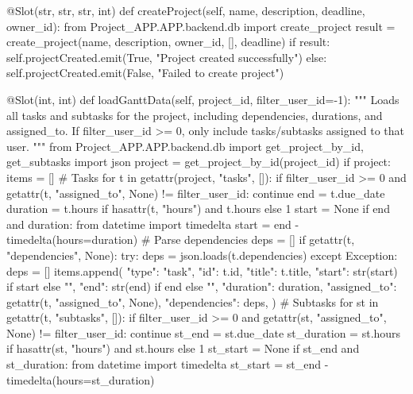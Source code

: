 \documentclass{report}
\begin{document}
\begin{python}
    @Slot(str, str, str, int)
    def createProject(self, name, description, deadline, owner_id):
        from Project_APP.APP.backend.db import create_project
        result = create_project(name, description, owner_id, [], deadline)
        if result:
            self.projectCreated.emit(True, "Project created successfully")
        else:
            self.projectCreated.emit(False, "Failed to create project")

    @Slot(int, int)
    def loadGanttData(self, project_id, filter_user_id=-1):
        """
        Loads all tasks and subtasks for the project, including dependencies, durations, and assigned_to.
        If filter_user_id >= 0, only include tasks/subtasks assigned to that user.
        """
        from Project_APP.APP.backend.db import get_project_by_id, get_subtasks
        import json
        project = get_project_by_id(project_id)
        if project:
            items = []
            # Tasks
            for t in getattr(project, "tasks", []):
                if filter_user_id >= 0 and getattr(t, "assigned_to", None) != filter_user_id:
                    continue
                end = t.due_date
                duration = t.hours if hasattr(t, "hours") and t.hours else 1
                start = None
                if end and duration:
                    from datetime import timedelta
                    start = end - timedelta(hours=duration)
                # Parse dependencies
                deps = []
                if getattr(t, "dependencies", None):
                    try:
                        deps = json.loads(t.dependencies)
                    except Exception:
                        deps = []
                items.append({
                    "type": "task",
                    "id": t.id,
                    "title": t.title,
                    "start": str(start) if start else "",
                    "end": str(end) if end else "",
                    "duration": duration,
                    "assigned_to": getattr(t, "assigned_to", None),
                    "dependencies": deps,
                })
                # Subtasks
                for st in getattr(t, "subtasks", []):
                    if filter_user_id >= 0 and getattr(st, "assigned_to", None) != filter_user_id:
                        continue
                    st_end = st.due_date
                    st_duration = st.hours if hasattr(st, "hours") and st.hours else 1
                    st_start = None
                    if st_end and st_duration:
                        from datetime import timedelta
                        st_start = st_end - timedelta(hours=st_duration)

\end{python}
\end{document}
